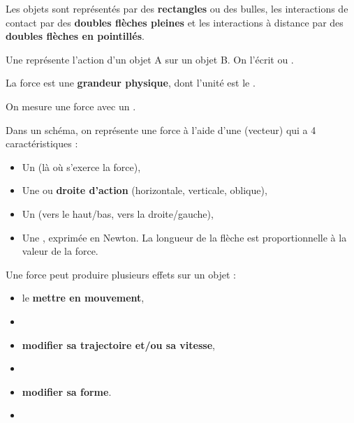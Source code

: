 \documentclass[11pt,a4paper]{article}
\begin{document}

Les objets sont représentés par des \textbf{rectangles} ou des bulles, les interactions de contact par des \textbf{doubles flèches pleines} et les interactions à distance par des \textbf{doubles flèches en pointillés}. 

\newpage



Une  représente l'action d'un objet A sur un objet B. On l'écrit  ou .

La force est une \textbf{grandeur physique}, dont l'unité est le .

On mesure une force avec un .


Dans un schéma, on représente une force à l'aide d'une  (vecteur) qui a 4 caractéristiques :
\begin{itemize}
    \item Un  (là où s'exerce la force),
    \item Une  ou \textbf{droite d'action} (horizontale, verticale, oblique),
    \item Un  (vers le haut/bas, vers la droite/gauche),
    \item Une , exprimée en Newton. La longueur de la flèche est proportionnelle à la valeur de la force.
\end{itemize}



Une force peut produire plusieurs effets sur un objet :
\begin{itemize}
    \item le \textbf{mettre en mouvement},
    \item[] 
    \item \textbf{modifier sa trajectoire et/ou sa vitesse},
    \item[] 
    \item \textbf{modifier sa forme}.
    \item[] 
\end{itemize}
\end{document}
